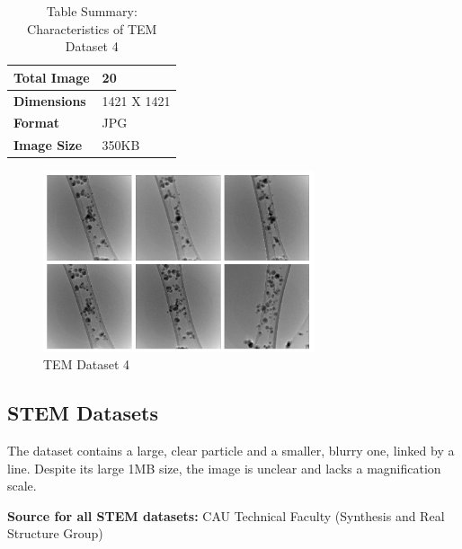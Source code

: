 \begin{itemize}
        \begin{table}[H]
                  \centering
                  \caption{Table Summary: Characteristics of TEM Dataset 4}
                  \begin{tabularx}{.7\linewidth}{|X|X|}
                    \hline
                    \textbf{Total Image} & 20 \\
                    \hline
                    \textbf{Dimensions} & 1421 X 1421\\
                    \hline
                    \textbf{Format} & JPG \\
                    \hline
                    \textbf{Image Size} & 350KB \\
                    \hline
                  \end{tabularx}
              \end{table}
            
        \begin{figure}[H]
        \centering
        \includegraphics[width=0.71\textwidth]{img/TEM Dataset 4.png}
        \caption{TEM Dataset 4}\label{fig:TEM Dataset 4}
        \end{figure}
    
\end{itemize}
\subsection{STEM Datasets}
    The dataset contains a large, clear particle and a smaller, blurry one, linked by a line. Despite its large 1MB size, the image is unclear and lacks a magnification scale.
    \vspace{5pt}
    
    \textbf{Source for all STEM datasets:} CAU Technical Faculty (Synthesis and Real Structure Group)
    
